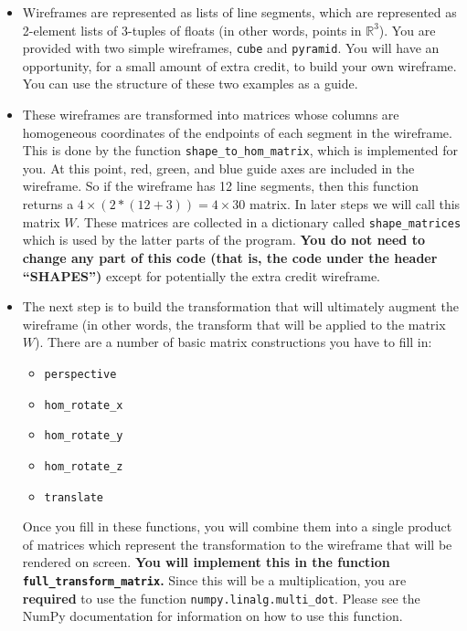 \documentclass{article}
\theoremstyle{remark}
\begin{document}
\begin{itemize}
\item
  Wireframes are represented as lists of line segments, which are represented as 2-element lists of 3-tuples of floats (in other words, points in $\mathbb R^3$).
  You are provided with two simple wireframes, \texttt{cube} and \texttt{pyramid}.
  You will have an opportunity, for a small amount of extra credit, to build your own wireframe.
  You can use the structure of these two examples as a guide.
\item
  These wireframes are transformed into matrices whose columns are homogeneous coordinates of the endpoints of each segment in the wireframe.
  This is done by the function \texttt{shape\_to\_hom\_matrix}, which is implemented for you.
  At this point, red, green, and blue guide axes are included in the wireframe.
  So if the wireframe has 12 line segments, then this function returns a $4 \times (2 * (12 + 3)) = 4 \times 30$ matrix.
  In later steps we will call this matrix $W$.
  These matrices are collected in a dictionary called \texttt{shape\_matrices} which is used by the latter parts of the program.
  \textbf{You do not need to change any part of this code (that is, the code under the header ``SHAPES'')} except for potentially the extra credit wireframe.

\item
  The next step is to build the transformation that will ultimately augment the wireframe (in other words, the transform that will be applied to the matrix $W$).
  There are a number of basic matrix constructions you have to fill in:
  \begin{itemize}
  \item \texttt{perspective}
  \item \texttt{hom\_rotate\_x}
  \item \texttt{hom\_rotate\_y}
  \item \texttt{hom\_rotate\_z}
  \item \texttt{translate}
  \end{itemize}
  Once you fill in these functions, you will combine them into a single product of matrices which represent the transformation to the wireframe that will be rendered on screen.
  \textbf{You will implement this in the function \texttt{full\_transform\_matrix}.}
  Since this will be a multiplication, you are \textbf{required} to use the function \texttt{numpy.linalg.multi\_dot}.
  Please see the NumPy documentation for information on how to use this function.


\end{itemize}
\end{document}
